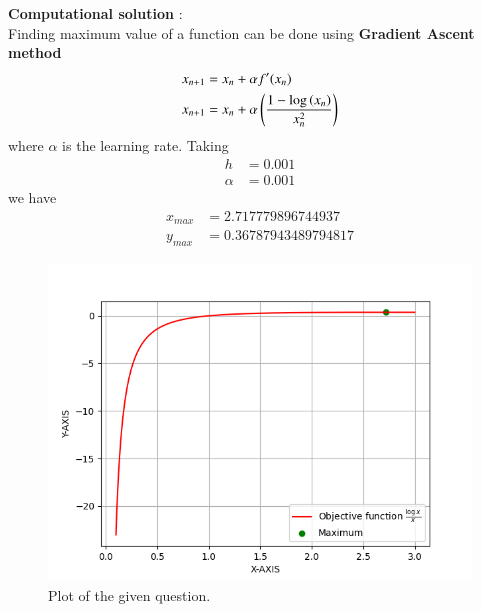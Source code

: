 \documentclass[journal]{IEEEtran}
\begin{document}
\textbf{Computational solution} : \\

Finding maximum value of a function can be done using \textbf{Gradient Ascent method} \\
\begin{align}
	x_{n+1} &= x_{n} + \alpha f^{\prime} (x_{n}) \\
	x_{n+1} &= x_{n} + \alpha \left(\frac{1 - \log \left(x_{n}\right)}{x_{n}^2}\right) 
\end{align}
where $\alpha$ is the learning rate.
Taking
\begin{align}
	h &= 0.001 \\
	\alpha &= 0.001
\end{align}
we have
\begin{align}
	x_{max} &= 2.717779896744937 \\
	y_{max} &= 0.36787943489794817
\end{align}

\begin{figure}[h]
\centering
\includegraphics[width=\columnwidth]{figs/fig.png}
\caption{Plot of the given question.}
\label{fig:Plot1} 
\end{figure}
\end{document}
